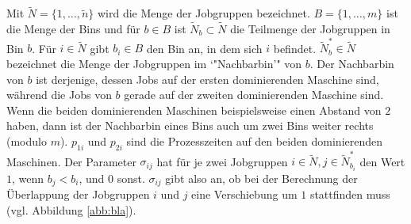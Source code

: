 \documentclass{scrreprt}
\begin{document}
Mit $\tilde{N}=\{1,\ldots,\tilde{n}\}$ wird die Menge der Jobgruppen bezeichnet.
$B=\{1,\ldots,m\}$ ist die Menge der Bins und für $b\in B$ ist $\tilde{N}_b\subset \tilde{N}$ die Teilmenge der Jobgruppen in Bin $b$.
Für $i\in\tilde{N}$ gibt $b_i\in B$ den Bin an, in dem sich $i$ befindet.
$\tilde{N}_b^*\in \tilde{N}$ bezeichnet die Menge der Jobgruppen im `"Nachbarbin'" von $b$.
Der Nachbarbin von $b$ ist derjenige, dessen Jobs auf der ersten dominierenden Maschine sind, während die Jobs von $b$ gerade auf der zweiten dominierenden Maschine sind.
Wenn die beiden dominierenden Maschinen beispielsweise einen Abstand von $2$ haben, dann ist der Nachbarbin eines Bins auch um zwei Bins weiter rechts (modulo $m$).
$p_{1i}$ und $p_{2i}$ sind die Prozesszeiten auf den beiden dominierenden Maschinen.
Der Parameter $\sigma_{ij}$ hat für je zwei Jobgruppen $i\in\tilde{N},j\in\tilde{N}^*_{b_i}$ den Wert $1$, wenn $b_j<b_i$, und $0$ sonst.
$\sigma_{ij}$ gibt also an, ob bei der Berechnung der Überlappung der Jobgruppen $i$ und $j$ eine Verschiebung um $1$ stattfinden muss (vgl. Abbildung \ref{abb:bla}).
\end{document}
